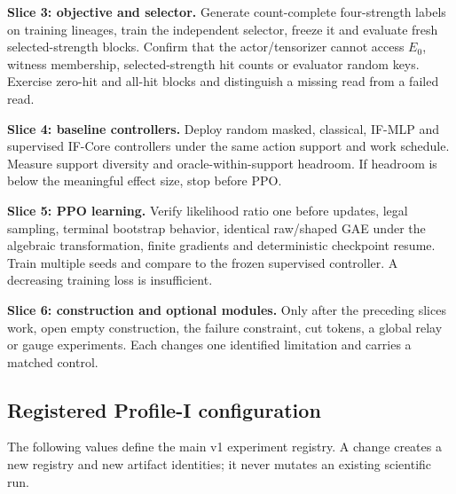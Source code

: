 \textbf{Slice 3: objective and selector.} Generate count-complete four-strength labels on training lineages, train the independent selector, freeze it and evaluate fresh selected-strength blocks. Confirm that the actor/tensorizer cannot access $E_0$, witness membership, selected-strength hit counts or evaluator random keys. Exercise zero-hit and all-hit blocks and distinguish a missing read from a failed read.

\textbf{Slice 4: baseline controllers.} Deploy random masked, classical, IF-MLP and supervised IF-Core controllers under the same action support and work schedule. Measure support diversity and oracle-within-support headroom. If headroom is below the meaningful effect size, stop before PPO.

\textbf{Slice 5: PPO learning.} Verify likelihood ratio one before updates, legal sampling, terminal bootstrap behavior, identical raw/shaped GAE under the algebraic transformation, finite gradients and deterministic checkpoint resume. Train multiple seeds and compare to the frozen supervised controller. A decreasing training loss is insufficient.

\textbf{Slice 6: construction and optional modules.} Only after the preceding slices work, open empty construction, the failure constraint, cut tokens, a global relay or gauge experiments. Each changes one identified limitation and carries a matched control.

\subsection{Registered Profile-I configuration}
The following values define the main v1 experiment registry. A change creates a new registry and new artifact identities; it never mutates an existing scientific run.

